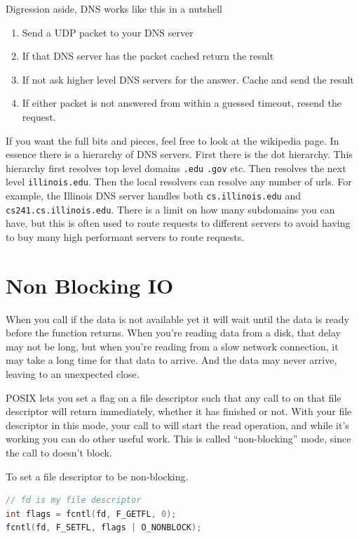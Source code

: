 Digression aside, DNS works like this in a nutshell
\begin{enumerate}
\item Send a UDP packet to your DNS server
\item If that DNS server has the packet cached return the result
\item If not ask higher level DNS servers for the answer. Cache and send the result
  \item If either packet is not answered from within a guessed timeout, resend the request.
\end{enumerate}

If you want the full bits and pieces, feel free to look at the wikipedia page.
In essence there is a hierarchy of DNS servers.
First there is the dot hierarchy.
This hierarchy first resolves top level domains \texttt{.edu} \texttt{.gov} etc.
Then resolves the next level \texttt{illinois.edu}.
Then the local resolvers can resolve any number of urls.
For example, the Illinois DNS server handles both \texttt{cs.illinois.edu} and \texttt{cs241.cs.illinois.edu}. There is a limit on how many subdomains you can have, but this is often used to route requests to different servers to avoid having to buy many high performant servers to route requests.

\section{Non Blocking IO}

When you call  if the data is not available yet it will wait until the data is ready before the function returns.
When you're reading data from a disk, that delay may not be long, but when you're reading from a slow network connection, it may take a long time for that data to arrive.
And the data may never arrive, leaving to an unexpected close.

POSIX lets you set a flag on a file descriptor such that any call to  on that file descriptor will return immediately, whether it has finished or not.
With your file descriptor in this mode, your call to  will start the read operation, and while it's working you can do other useful work.
This is called ``non-blocking'' mode, since the call to  doesn't block.

To set a file descriptor to be non-blocking.

\begin{lstlisting}[language=C]
// fd is my file descriptor
int flags = fcntl(fd, F_GETFL, 0);
fcntl(fd, F_SETFL, flags | O_NONBLOCK);
\end{lstlisting}

